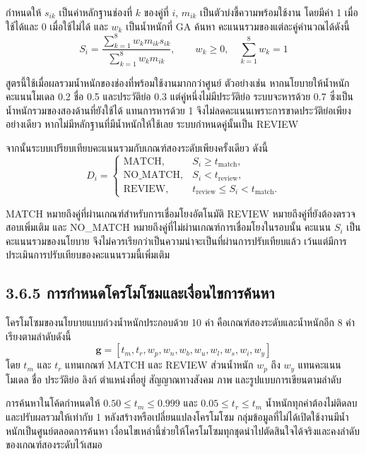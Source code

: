 \documentclass[12pt,a4paper]{report}
\begin{document}
กำหนดให้ $s_{ik}$ เป็นค่าหลักฐานช่องที่ $k$ ของคู่ที่ $i$, $m_{ik}$ เป็นตัวบ่งชี้ความพร้อมใช้งาน โดยมีค่า 1 เมื่อใช้ได้และ 0 เมื่อใช้ไม่ได้ และ $w_k$ เป็นน้ำหนักที่ GA ค้นหา คะแนนรวมของแต่ละคู่คำนวณได้ดังนี้
\begin{equation*}
S_i=\frac{\sum_{k=1}^{8} w_k m_{ik}s_{ik}}{\sum_{k=1}^{8} w_k m_{ik}},\qquad w_k\geq 0,\quad \sum_{k=1}^{8}w_k=1
\end{equation*}

สูตรนี้ใช้เมื่อผลรวมน้ำหนักของช่องที่พร้อมใช้งานมากกว่าศูนย์ ตัวอย่างเช่น หากนโยบายให้น้ำหนักคะแนนโมเดล 0.2 ชื่อ 0.5 และประวัติย่อ 0.3 แต่คู่หนึ่งไม่มีประวัติย่อ ระบบจะหารด้วย 0.7 ซึ่งเป็นน้ำหนักรวมของสองด้านที่ยังใช้ได้ แทนการหารด้วย 1 จึงไม่ลดคะแนนเพราะการขาดประวัติย่อเพียงอย่างเดียว หากไม่มีหลักฐานที่มีน้ำหนักให้ใช้เลย ระบบกำหนดคู่นั้นเป็น REVIEW

จากนั้นระบบเปรียบเทียบคะแนนรวมกับเกณฑ์สองระดับเพียงครั้งเดียว ดังนี้
\begin{equation*}
D_i=\begin{cases}
\mathrm{MATCH}, & S_i\geq t_{\mathrm{match}},\\
\mathrm{NO\_MATCH}, & S_i<t_{\mathrm{review}},\\
\mathrm{REVIEW}, & t_{\mathrm{review}}\leq S_i<t_{\mathrm{match}}.
\end{cases}
\end{equation*}

MATCH หมายถึงคู่ที่ผ่านเกณฑ์สำหรับการเชื่อมโยงอัตโนมัติ REVIEW หมายถึงคู่ที่ยังต้องตรวจสอบเพิ่มเติม และ NO\_MATCH หมายถึงคู่ที่ไม่ผ่านเกณฑ์การเชื่อมโยงในรอบนั้น คะแนน $S_i$ เป็นคะแนนรวมของนโยบาย จึงไม่ควรเรียกว่าเป็นความน่าจะเป็นที่ผ่านการปรับเทียบแล้ว เว้นแต่มีการประเมินการปรับเทียบของคะแนนรวมนี้เพิ่มเติม

\subsection*{3.6.5 การกำหนดโครโมโซมและเงื่อนไขการค้นหา}
โครโมโซมของนโยบายแบบถ่วงน้ำหนักประกอบด้วย 10 ค่า คือเกณฑ์สองระดับและน้ำหนักอีก 8 ค่า เรียงตามลำดับดังนี้
\begin{equation*}
\boldsymbol{g}=[t_m,t_r,w_p,w_n,w_b,w_u,w_l,w_s,w_i,w_y]
\end{equation*}
โดย $t_m$ และ $t_r$ แทนเกณฑ์ MATCH และ REVIEW ส่วนน้ำหนัก $w_p$ ถึง $w_y$ แทนคะแนนโมเดล ชื่อ ประวัติย่อ ลิงก์ ตำแหน่งที่อยู่ สัญญาณทางสังคม ภาพ และรูปแบบการเขียนตามลำดับ

การค้นหาในโค้ดกำหนดให้ $0.50\leq t_m\leq0.999$ และ $0.05\leq t_r\leq t_m$ น้ำหนักทุกค่าต้องไม่ติดลบ และปรับผลรวมให้เท่ากับ 1 หลังสร้างหรือเปลี่ยนแปลงโครโมโซม กลุ่มข้อมูลที่ไม่ได้เปิดใช้งานมีน้ำหนักเป็นศูนย์ตลอดการค้นหา เงื่อนไขเหล่านี้ช่วยให้โครโมโซมทุกชุดนำไปตัดสินใจได้จริงและคงลำดับของเกณฑ์สองระดับไว้เสมอ
\end{document}
